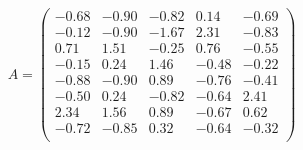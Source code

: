 \documentclass[a4,12pt,twosided,openany]{memoir}
\begin{document}
\[ A = 
\begin{pmatrix}
 -0.68 &     -0.90 &  -0.82 &   0.14 & -0.69 \\
 -0.12 &     -0.90 &  -1.67 &   2.31 &  -0.83 \\ 
  0.71 &      1.51 &  -0.25 &  0.76 &  -0.55 \\ 
 -0.15 &      0.24 &   1.46 &  -0.48 &  -0.22 \\ 
 -0.88 &     -0.90 &   0.89 &   -0.76 &  -0.41 \\ 
 -0.50 &      0.24 &   -0.82 &  -0.64 &   2.41 \\ 
  2.34 &      1.56 &    0.89 &  -0.67 &   0.62 \\ 
 -0.72 &     -0.85 &    0.32 &  -0.64 &   -0.32 \\ 
\end{pmatrix}
\]
\end{document}
